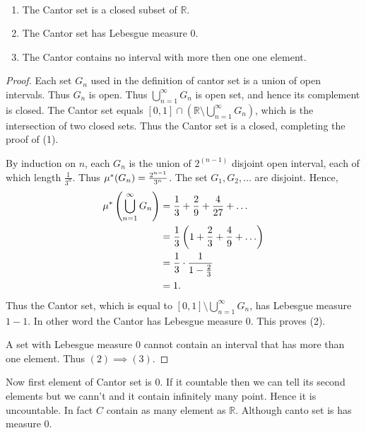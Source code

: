 \begin{theorem}
    \ 
    \begin{enumerate}
        \item The Cantor set is a closed subset of $\mathds{R}$.
        \item The Cantor set has Lebesgue measure $0$.
        \item The Cantor contains no interval with more then one one element.
    \end{enumerate}
\end{theorem}
\begin{proof}
    Each set $G_n$ used in the definition of cantor set is a union of open intervals. Thus  $G_n$ is open. Thus  $\bigcup_{n=1}^{\infty}G_n$ is open set,
    and hence its complement is closed. The Cantor set equals $[0,1]\cap\left( \mathds{R}\setminus \bigcup_{n=1}^{\infty}G_n \right)$, which is the intersection of 
    two closed sets. Thus the Cantor set is a closed, completing the proof of (1).

    By induction on $n$, each  $G_n$ is the union of  $2^(n-1)$ disjoint open interval, each of which length  $\frac{1}{3^{n}}$. Thus $\mu^{*}(G_n)=\frac{2^{n-1}}{3^{n}}$.
    The set $G_1,G_2,\ldots$ are disjoint. Hence,
    \begin{align*}
        \mu^{*}\left( \bigcup_{n=1}^{\infty}G_n \right) &= \frac{1}{3}+\frac{2}{9}+\frac{4}{27}+\ldots\\
                                                     &= \frac{1}{3}\left( 1 +\frac{2}{3}+\frac{4}{9}+\ldots\right) \\
                                                     &=\frac{1}{3}\cdot\frac{1}{1-\frac{2}{3}}\\
                                                     &=1.
    \end{align*}
    Thus the Cantor set, which is equal to $[0,1]\setminus \bigcup_{n=1}^{\infty}G_n$, has Lebesgue measure $1-1$. In other word the Cantor has Lebesgue measure  $0$.
    This proves (2).

    A set with Lebesgue measure  $0$ cannot contain an interval that has more than one element. Thus  $(2)\implies(3)$.
\end{proof}

Now first element of Cantor set is $0$. If it countable then we can tell its second elements but we cann't and it contain infinitely many point. Hence it is uncountable.
In fact $C$ contain as many element as  $\mathds{R}$. Although canto set is has measure $0$.
